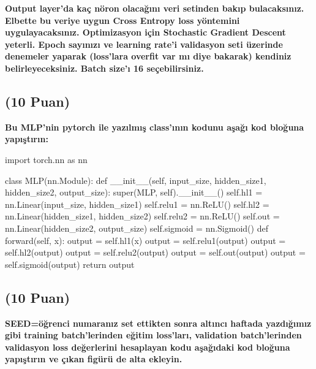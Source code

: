 \documentclass[11pt]{article}
\begin{document}
\textbf{Output layer'da kaç nöron olacağını veri setinden bakıp bulacaksınız. Elbette bu veriye uygun Cross Entropy loss yöntemini uygulayacaksınız. Optimizasyon için Stochastic Gradient Descent yeterli. Epoch sayınızı ve learning rate'i validasyon seti üzerinde denemeler yaparak (loss'lara overfit var mı diye bakarak) kendiniz belirleyeceksiniz. Batch size'ı 16 seçebilirsiniz.}

\subsection{(10 Puan)} \textbf{Bu MLP'nin pytorch ile yazılmış class'ının kodunu aşağı kod bloğuna yapıştırın:}

\begin{python}
import torch.nn as nn

class MLP(nn.Module):
    def __init__(self, input_size, hidden_size1, hidden_size2, output_size):
        super(MLP, self).__init__()
        self.hl1 = nn.Linear(input_size, hidden_size1)
        self.relu1 = nn.ReLU()
        self.hl2 = nn.Linear(hidden_size1, hidden_size2)
        self.relu2 = nn.ReLU()
        self.out = nn.Linear(hidden_size2, output_size)
        self.sigmoid = nn.Sigmoid()
    def forward(self, x):
        output = self.hl1(x)
        output = self.relu1(output)
        output = self.hl2(output)
        output = self.relu2(output)
        output = self.out(output)
        output = self.sigmoid(output)
        return output
\end{python}

\subsection{(10 Puan)} \textbf{SEED=öğrenci numaranız set ettikten sonra altıncı haftada yazdığımız gibi training batch'lerinden eğitim loss'ları, validation batch'lerinden validasyon loss değerlerini hesaplayan kodu aşağıdaki kod bloğuna yapıştırın ve çıkan figürü de alta ekleyin.}
\end{document}
